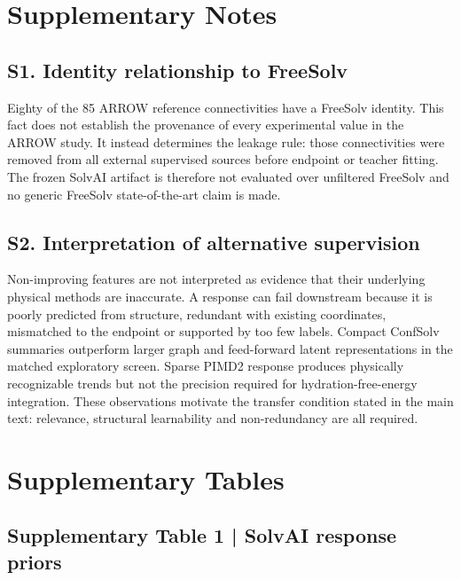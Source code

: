 \documentclass[10pt]{article}
\begin{document}
\section*{Supplementary Notes}

\subsection*{S1. Identity relationship to FreeSolv}

Eighty of the 85 ARROW reference connectivities have a FreeSolv identity. This fact
does not establish the provenance of every experimental value in the ARROW study.
It instead determines the leakage rule: those connectivities were removed from all
external supervised sources before endpoint or teacher fitting. The frozen SolvAI
artifact is therefore not evaluated over unfiltered FreeSolv and no generic FreeSolv
state-of-the-art claim is made.

\subsection*{S2. Interpretation of alternative supervision}

Non-improving features are not interpreted as evidence that their underlying
physical methods are inaccurate. A response can fail downstream because it is
poorly predicted from structure, redundant with existing coordinates, mismatched to
the endpoint or supported by too few labels. Compact ConfSolv summaries outperform
larger graph and feed-forward latent representations in the matched exploratory
screen. Sparse PIMD2 response produces physically recognizable trends but not the
precision required for hydration-free-energy integration. These observations
motivate the transfer condition stated in the main text: relevance, structural
learnability and non-redundancy are all required.

\section*{Supplementary Tables}

\subsection*{Supplementary Table 1 | SolvAI response priors}
\scriptsize
\resizebox{\textwidth}{!}{}
\normalsize
\end{document}
